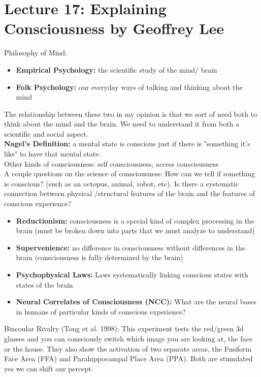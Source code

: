 \documentclass{article}
\begin{document}
\section{Lecture 17: Explaining Consciousness by Geoffrey Lee}
Philosophy of Mind: \\
\begin{itemize}
    \item \textbf{Empirical Psychology:} the scientific study of the mind/ brain
    \item \textbf{Folk Psychology:} our everyday ways of talking and thinking about the mind
\end{itemize}
The relationship between these two in my opinion is that we sort of need both to think about the mind and the brain. We need to understand it from both a scientific and social aspect. \\ 

\noindent \textbf{Nagel's Definition:} a mental state is conscious just if there is "something it's like" to have that mental state. \\ 
Other kinds of consciousness: self consciousness, access consciousness \\ 

A couple questions on the science of consciousness: How can we tell if something is conscious? (such as an octopus, animal, robot, etc). Is there a systematic connection between physical /structural features of the brain and the features of conscious experience? \\

\begin{itemize}
    \item \textbf{Reductionism:} consciousness is a special kind of complex processing in the brain (must be broken down into parts that we must analyze to understand)
    \item \textbf{Supervenience:} no difference in consciousness without differences in the brain (consciousness is fully determined by the brain)
    \item \textbf{Psychophysical Laws:} Laws systematically linking conscious states with states of the brain
    \item \textbf{Neural Correlates of Consciousness (NCC):} What are the neural bases in humans of particular kinds of conscious experience?
\end{itemize}

\noindent Bincoular Rivalry (Tong et al. 1998): This experiment tests the red/green 3d glasses and you can consciously switch which image you are looking at, the face or the house. They also show the activation of two separate areas, the Fusiform Face Area (FFA) and Parahippocampal Place Area (PPA). Both are stimulated yes we can shift our percept. 
\end{document}
